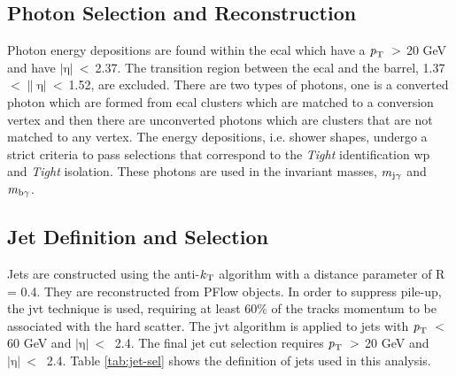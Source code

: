 \subsection{Photon Selection and Reconstruction}

Photon energy depositions are found within the \gls{ecal} which have a $\textrm{\textit{p}}_{\textrm{T}} \ >$ 20 GeV and have $|\textrm{η}|\ < \ $2.37. The transition region between the \gls{ecal} and the 
barrel, 1.37 $< \|\textrm{η}|\ < \ $1.52, are excluded. There are two types of photons, one is a converted photon which are formed from \gls{ecal} clusters which are matched to a conversion vertex 
and then there are unconverted photons which are clusters that are not matched to any vertex. The energy depositions, i.e. shower shapes, undergo a strict criteria to pass selections that 
correspond to the \textit{Tight} identification \gls{wp} and \textit{Tight} isolation. These photons are used in the invariant masses, $\textrm{\textit{m}}_{\textrm{j}\gamma}$ and 
$\textrm{\textit{m}}_{\textrm{b}\gamma}$. 

\subsection{Jet Definition and Selection}

Jets are constructed using the anti-$\textrm{\textit{k}}_{\textrm{T}}$ algorithm with a distance parameter of R = 0.4. They are reconstructed from PFlow objects. In order to suppress pile-up, the \gls{jvt} technique is used, 
requiring at least 60\% of the tracks momentum to be associated with the hard scatter. The \gls{jvt} algorithm is applied to jets with $\textrm{\textit{p}}_{\textrm{T}} \ <$ 60 GeV and $|\textrm{η}|\ < \ $ 2.4.
The final jet cut selection requires $\textrm{\textit{p}}_{\textrm{T}} \ >$ 20 GeV and $|\textrm{η}|\ < \ $ 2.4. Table \ref{tab:jet-sel} shows the definition of jets used in this analysis. 

